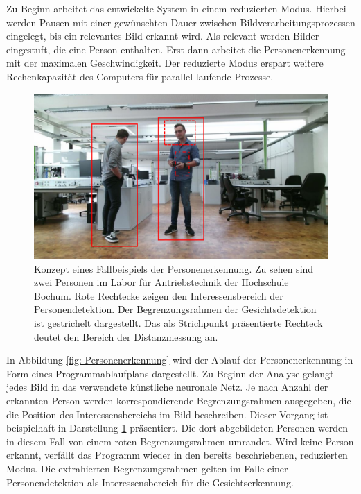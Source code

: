 	
	
	
	\newpage

		Zu Beginn arbeitet das entwickelte System in einem reduzierten Modus.    Hierbei werden Pausen mit einer gewünschten Dauer zwischen Bildverarbeitungsprozessen eingelegt, bis ein relevantes Bild erkannt wird. Als relevant werden Bilder eingestuft, die eine Person enthalten. Erst dann arbeitet die Personenerkennung mit der maximalen Geschwindigkeit. Der reduzierte Modus erspart weitere Rechenkapazität des Computers für parallel laufende Prozesse. 
		

	
	
	\begin{figure}[H]
		\centering
		\includegraphics[width=1\textwidth]{Bilder/person.pdf}
		\caption{Konzept eines Fallbeispiels der Personenerkennung. Zu sehen sind zwei Personen im Labor für Antriebstechnik der Hochschule Bochum. Rote Rechtecke zeigen den Interessensbereich der Personendetektion. Der Begrenzungsrahmen der Gesichtsdetektion ist gestrichelt dargestellt. Das als Strichpunkt präsentierte Rechteck deutet den Bereich der Distanzmessung an.}
		\label{fig: bbox}
	\end{figure}
		In Abbildung \ref{fig: Personenerkennung} wird der Ablauf der Personenerkennung in Form eines Programmablaufplans dargestellt. Zu Beginn der Analyse gelangt jedes Bild in das verwendete künstliche neuronale Netz. Je nach Anzahl der erkannten Person werden korrespondierende Begrenzungsrahmen ausgegeben, die die Position des Interessensbereichs im Bild beschreiben. Dieser Vorgang ist beispielhaft in Darstellung \ref{fig: bbox} präsentiert. Die dort abgebildeten Personen werden in diesem Fall von einem roten Begrenzungsrahmen umrandet. Wird keine Person erkannt, verfällt das Programm wieder in den bereits beschriebenen, reduzierten Modus. Die extrahierten Begrenzungsrahmen gelten im Falle einer Personendetektion als Interessensbereich für die Gesichtserkennung.\\
		
